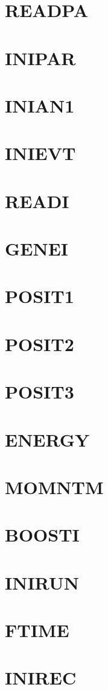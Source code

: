 \documentclass[14pt,UTF8]{ctexbook}
\begin{document}
\section{READPA}
\section{INIPAR}
\section{INIAN1}
\section{INIEVT}
\section{READI}
\section{GENEI}
\section{POSIT1}
\section{POSIT2}
\section{POSIT3}
\section{ENERGY}
\section{MOMNTM}
\section{BOOSTI}
\section{INIRUN}
\section{FTIME}
\section{INIREC}
\end{document}
